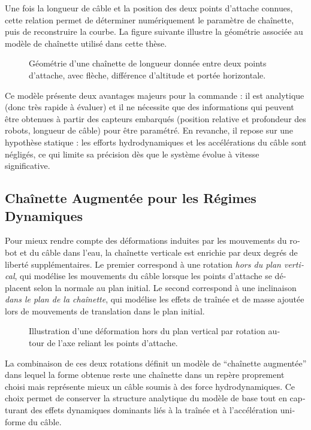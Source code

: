 \begin{otherlanguage}{french}
	Une fois la longueur de câble et la position des deux points d'attache connues, cette relation
	permet de déterminer numériquement le paramètre de chaînette, puis de reconstruire la courbe. La
	figure suivante illustre la géométrie associée au modèle de chaînette utilisé dans cette thèse.

	\begin{figure}
		\centering
		\caption{
			Géométrie d'une chaînette de longueur donnée entre deux points d'attache, avec flèche, différence d'altitude et portée horizontale.
		}
	\end{figure}

	Ce modèle présente deux avantages majeurs pour la commande : il est analytique (donc très rapide à
	évaluer) et il ne nécessite que des informations qui peuvent être obtenues à partir des capteurs
	embarqués (position relative et profondeur des robots, longueur de câble) pour être paramétré. En
	revanche, il repose sur une hypothèse statique : les efforts hydrodynamiques et les accélérations
	du câble sont négligés, ce qui limite sa précision dès que le système évolue à vitesse
	significative.

	\subsection{Chaînette Augmentée pour les Régimes Dynamiques}

	Pour mieux rendre compte des déformations induites par les mouvements du robot et du câble dans
	l'eau, la chaînette verticale est enrichie par deux degrés de liberté supplémentaires. Le premier
	correspond à une rotation \emph{hors du plan vertical}, qui modélise les mouvements du câble
	lorsque les points d'attache se déplacent selon la normale au plan initial. Le second correspond à
	une inclinaison \emph{dans le plan de la chaînette}, qui modélise les effets de traînée et de masse
	ajoutée lors de mouvements de translation dans le plan initial.

	\begin{figure}
		\centering
		\caption{
			Illustration d'une déformation hors du plan vertical par rotation autour de l'axe reliant les points d'attache.
		}
	\end{figure}

	La combinaison de ces deux rotations définit un modèle de \enquote{chaînette augmentée} dans lequel
	la forme obtenue reste une chaînette dans un repère proprement choisi mais représente mieux un
	câble soumis à des force hydrodynamiques. Ce choix permet de conserver la structure analytique du
	modèle de base tout en capturant des effets dynamiques dominants liés à la traînée et à
	l'accélération uniforme du câble.


\end{otherlanguage}
